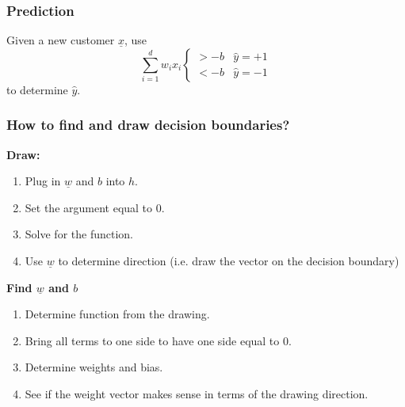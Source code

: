     \subsubsection{Prediction}
    \begin{definition}
        Given a new customer $\underline{x}$, use
        \[
        \sum_{i=1}^{d} w_i x_i \begin{cases} 
        > -b & \hat{y} = +1 \\
        < -b & \hat{y} = -1
        \end{cases}
        \]
        to determine $\hat{y}$.
    \end{definition}

    \subsubsection{How to find and draw decision boundaries?}
    \begin{process}
        \textbf{Draw:}
        \begin{enumerate}
            \item Plug in $\underline{w}$ and $b$ into $h$. 
            \item Set the argument equal to 0. 
            \item Solve for the function. 
            \item Use $\underline{w}$ to determine direction (i.e. draw the vector on the decision boundary)
        \end{enumerate}
        \vspace{1em}

        \textbf{Find $\underline{w}$ and $b$}
        \begin{enumerate}
            \item Determine function from the drawing.
            \item Bring all terms to one side to have one side equal to 0. 
            \item Determine weights and bias. 
            \item See if the weight vector makes sense in terms of the drawing direction.
        \end{enumerate}
    \end{process}
